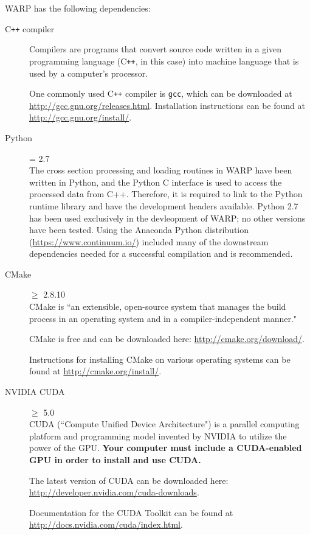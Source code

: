\documentclass[twoside,a4paper]{refart}
\begin{document}
WARP has the following dependencies:

\begin{description}

\item[C\texttt{++} compiler]
Compilers are programs that convert source code written in a given programming language (C\texttt{++}, in 
this case) into machine language that is used by a computer's processor.

One commonly used C\texttt{++} compiler is \texttt{gcc}, which can be downloaded at 
\url{http://gcc.gnu.org/releases.html}. Installation instructions can be found at 
\url{http://gcc.gnu.org/install/}.

\item[Python] = 2.7 \\
The cross section processing and loading routines in WARP have been written in Python, and the Python C interface is used to access the processed data from C++.  Therefore, it is required to link to the Python runtime library and have the development headers available.  Python 2.7 has been used exclusively in the devleopment of WARP; no other versions have been tested.  Using the Anaconda Python distribution (\url{https://www.continuum.io/}) included many of the downstream dependencies needed for a successful compilation and is recommended.

\item[CMake]$\ge$ 2.8.10 \\
CMake is ``an extensible, open-source system that manages the build process in an operating system and in
a compiler-independent manner."

CMake is free and can be downloaded here: \url{http://cmake.org/download/}.

Instructions for installing CMake on various operating systems can be found at 
\url{http://cmake.org/install/}.
  
\item[NVIDIA CUDA]$\ge$ 5.0 \\
CUDA (``Compute Unified Device Architecture") is a parallel computing platform and programming model 
invented by NVIDIA to utilize the power of the GPU. \textbf{Your computer must include a CUDA-enabled 
GPU in order to install and use CUDA.}

The latest version of CUDA can be downloaded here: \url{http://developer.nvidia.com/cuda-downloads}.

Documentation for the CUDA Toolkit can be found at \url{http://docs.nvidia.com/cuda/index.html}.


\end{description}
\end{document}
